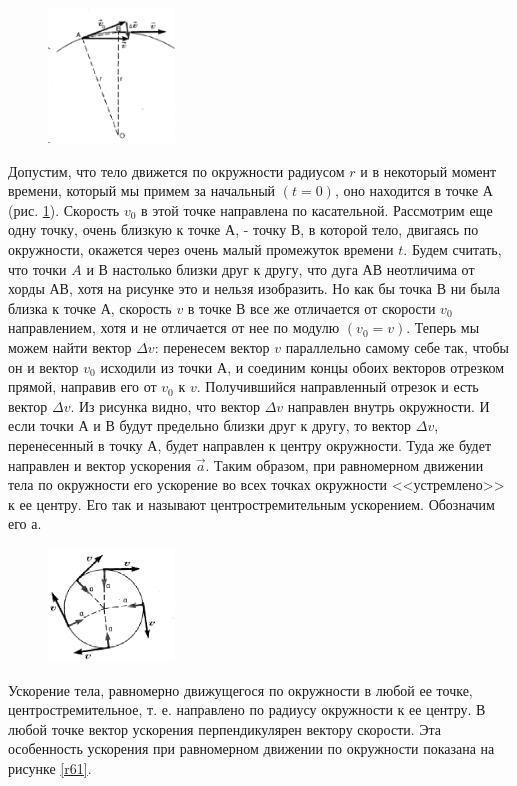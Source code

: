 \documentclass[a6paper, 11pt]{diss_4}
\renewcommand{\'}{\,'}
\begin{document}
\begin{figure}
\includegraphics[width=0.3\textwidth]{img/img_21.eps}
\caption{}
\label{r60}
\end{figure}
  Допустим, что тело движется по окружности радиусом $r$ и в некоторый момент
времени, который мы примем за начальный $(t = 0)$, оно находится в точке $А$
(рис. \ref{r60}). Скорость $v_0$ в этой точке направлена по касательной. Рассмотрим
еще одну точку, очень близкую к точке $А$, - точку $В$, в которой тело,
двигаясь по окружности, окажется через очень малый промежуток времени $t$.
Будем считать, что точки $A$ и $В$ настолько близки друг к другу, что дуга
$АВ$ неотличима от хорды $АВ$, хотя на рисунке это и нельзя изобразить. Но
как бы точка $В$ ни была близка к точке $А$, скорость $v$ в точке $В$ все же
отличается от скорости $v_0$ направлением, хотя и не отличается от нее по
модулю $(v_0 = v)$. Теперь мы можем найти вектор $\Delta v$: перенесем вектор
$v$ параллельно самому себе так, чтобы он и вектор $v_0$ исходили из точки
$А$, и соединим концы обоих векторов отрезком прямой, направив его от $v_0$ к
$v$. Получившийся направленный отрезок и есть вектор $\Delta v$. Из рисунка
видно, что вектор $\Delta v$ направлен внутрь окружности. И если точки $А$ и
$В$ будут предельно близки друг к другу, то вектор $\Delta v$, перенесенный в
точку $А$, будет направлен к центру окружности. Туда же будет направлен и
вектор ускорения $\vec{a}$. Таким образом, при равномерном движении тела по
окружности его ускорение во всех точках окружности <<устремлено>> к ее центру.
Его так и называют центростремительным ускорением. Обозначим его $а$.

\begin{figure}
\includegraphics[width=0.3\textwidth]{img/img_22.eps}
\caption{}
\label{r63}
\end{figure}
  Ускорение тела, равномерно движущегося по окружности в любой ее точке,
центростремительное, т. е. направлено по радиусу окружности к ее центру. В
любой точке вектор ускорения перпендикулярен вектору скорости. Эта особенность
ускорения при равномерном движении по окружности показана на рисунке \ref{r61}.
\end{document}
